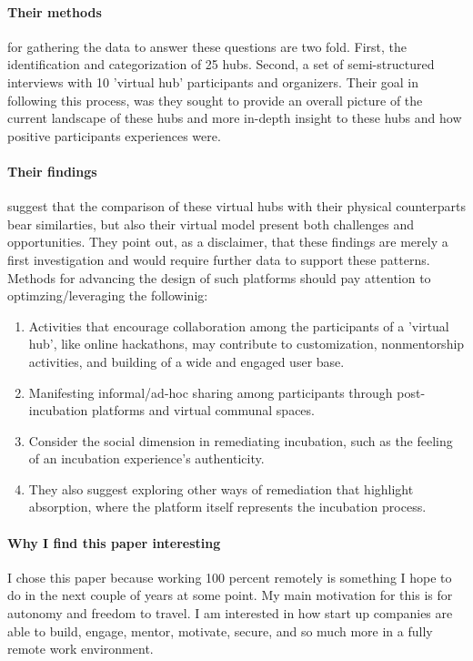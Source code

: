 \paragraph{Their methods} for gathering the data to answer these questions are two fold. First, the identification and categorization of 25 hubs. Second, a set of semi-structured interviews with 10 'virtual hub' participants and organizers. Their goal in following this process, was they sought to provide an overall picture of the current landscape of these hubs and more in-depth insight to these hubs and how positive participants experiences were.

\paragraph{Their findings} suggest that the comparison of these virtual hubs with their physical counterparts bear similarties, but also their virtual model present both challenges and opportunities. They point out, as a disclaimer, that these findings are merely a first investigation and would require further data to support these patterns. Methods for advancing the design of such platforms should pay attention to optimzing/leveraging the followinig:

\begin{enumerate}
\item
  Activities that encourage collaboration among the participants of a 'virtual hub', like online hackathons, may contribute to customization, nonmentorship activities, and building of a wide and engaged user base.
\item
  Manifesting informal/ad-hoc sharing among participants through post-incubation platforms and virtual communal spaces.
\item
  Consider the social dimension in remediating incubation, such as the feeling of an incubation experience's authenticity.
\item
  They also suggest exploring other ways of remediation that highlight absorption, where the platform itself represents the incubation process.
\end{enumerate}

\paragraph{Why I find this paper interesting}
I chose this paper because working 100 percent remotely is something I hope to do in the next couple of years at some point. My main motivation for this is for autonomy and freedom to travel. I am interested in how start up companies are able to build, engage, mentor, motivate, secure, and so much more in a fully remote work environment.

